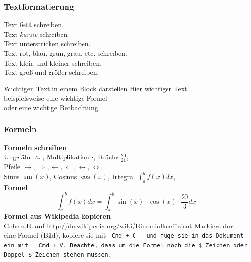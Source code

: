 \documentclass{rwth-beamer}
\begin{document}
\begin{frame}[t]
	\frametitle{Textformatierung}
	
	Text {\bf fett} schreiben. \\
	Text {\it kursiv} schreiben. \\
	Text \underline{unterstrichen} schreiben. \\
	Text {\color{red} rot}, {\color{blue} blau},  {\color{darkgreen} grün}, {\color{gray} grau},  {\color{blue!60!red} etc.}  schreiben. \\
	Text {\small klein} und {\footnotesize kleiner} schreiben. \\
	Text {\large groß} und {\Large größer} schreiben. \\
	
	\begin{block}{Wichtigen Text in einem Block darstellen}
		Hier wichtiger Text \\
		beispielsweise eine wichtige Formel \\
		oder eine wichtige Beobachtung
	\end{block}
\end{frame}


\begin{frame}[t]
	\frametitle{Formeln}
	
	{\bf Formeln schreiben} \\
	Ungefähr $\approx$, Multiplikation $\cdot$, Brüche $\frac{20}{21}$, \\
	Pfeile $\rightarrow, \Rightarrow, \leftarrow, \Leftarrow, \leftrightarrow, \Leftrightarrow$, \\
	Sinus $\sin(x)$, Cosinus $\cos(x)$, Integral $\int_a^b f(x) dx$,
	\\[5mm]
	{\bf Formel}
	$$
		\int_{a}^{b} f(x) dx = \int_{a}^{b} \sin(x) \cdot \cos(x) \cdot \frac{20}{3} dx
	$$
	{\bf Formel aus Wikipedia kopieren}\\
	Gehe z.B. auf	\url{http://de.wikipedia.org/wiki/Binomialkoeffizient}
	Markiere dort eine Formel (Bild), kopiere sie mit \, \tt{Cmd + C} \, und füge sie in das Dokument ein mit \, \tt{Cmd + V}.
	Beachte, dass um die Formel noch die \$ Zeichen oder Doppel-\$ Zeichen stehen müssen.
\end{frame}
\end{document}
